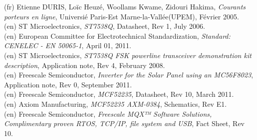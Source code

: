 \documentclass[11pt, a4paper, twoside]{book}
\begin{document}
\begin{thebibliography}{9}
  
  (fr)
  Etienne DURIS, Loïc Heuzé, Woollams Kwame, Zidouri Hakima,
  \emph{Courants porteurs en ligne},
  Universié Paris-Est Marne-la-Vallée(UPEM),
  Février 2005.\\
  
  (en)
  ST Microelectronics,
  \emph{ST7538Q},
  Datasheet, Rev 1, July 2006.\\
  
  (en)
  European Committee for Electrotechnical Standardization,
  \emph{Standard: CENELEC - EN 50065-1},
  April 01, 2011.\\

  (en)
  ST Microelectronics,
  \emph{ST7538Q FSK powerline transceiver demonstration kit description},
  Application note, Rev 4, February 2008.\\
  
  (en)
  Freescale Semiconductor,
  \emph{Inverter for the Solar Panel using an MC56F8023},
  Application note, Rev 0, September 2011.\\
  
  (en)
  Freescale Semiconductor,
  \emph{MCF52235},
  Datasheet, Rev 10, March 2011.\\
  
  (en)
  Axiom Manufacturing,
  \emph{MCF52235 AXM-0384},
  Schematics, Rev E1.\\
  
  (en)
  Freescale Semiconductor,
  \emph{Freescale MQX™  Software Solutions, Complimentary proven RTOS, TCP/IP,  file system and USB},
  Fact Sheet, Rev 10.\\

\end{thebibliography}
\end{document}
